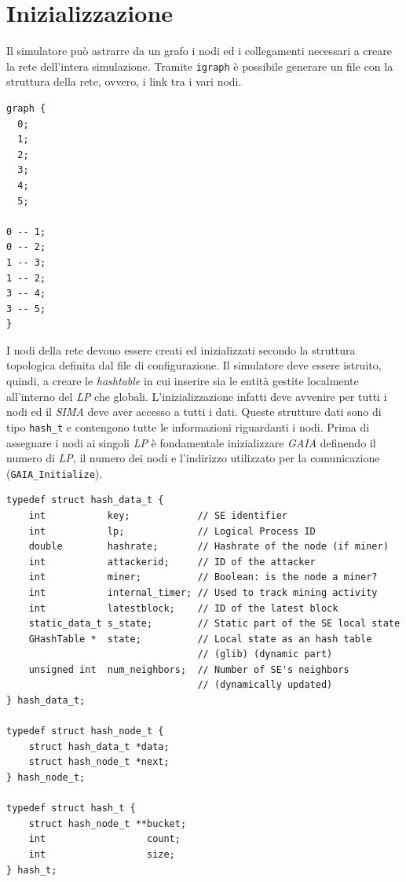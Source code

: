 \section{Inizializzazione}
Il simulatore può astrarre da un grafo i nodi ed i collegamenti necessari a creare la rete dell'intera simulazione. Tramite \texttt{igraph} è possibile generare un file con la struttura della rete, ovvero, i link tra i vari nodi.
\begin{lstlisting}[frame=none,caption=Esempio di un file generato da \texttt{igraph} con $6$ nodi.]
graph {
  0;
  1;
  2;
  3;
  4;
  5;

0 -- 1;
0 -- 2;
1 -- 3;
1 -- 2;
3 -- 4;
3 -- 5;
}
\end{lstlisting}
I nodi della rete devono essere creati ed inizializzati secondo la struttura topologica definita dal file di configurazione.
Il simulatore deve essere istruito, quindi, a creare le \textit{hashtable} in cui inserire sia le entità gestite localmente all'interno del \textit{LP} che globali. L'inizializzazione infatti deve avvenire per tutti i nodi ed il \textit{SIMA} deve aver accesso a tutti i dati. Queste strutture dati sono di tipo \texttt{hash\_t} e contengono tutte le informazioni riguardanti i nodi.\newline
Prima di assegnare i nodi ai singoli \textit{LP} è fondamentale inizializzare \textit{GAIA} definendo il numero di \textit{LP}, il numero dei nodi e l'indirizzo utilizzato per la comunicazione (\texttt{GAIA\_Initialize}).
\clearpage
\begin{code}
\begin{verbatim}
typedef struct hash_data_t {
    int           key;            // SE identifier
    int           lp;             // Logical Process ID
    double        hashrate;       // Hashrate of the node (if miner)
    int           attackerid;     // ID of the attacker
    int           miner;          // Boolean: is the node a miner?
    int           internal_timer; // Used to track mining activity
    int           latestblock;    // ID of the latest block
    static_data_t s_state;        // Static part of the SE local state
    GHashTable *  state;          // Local state as an hash table
                                  // (glib) (dynamic part)
    unsigned int  num_neighbors;  // Number of SE's neighbors
                                  // (dynamically updated)
} hash_data_t;

typedef struct hash_node_t {
    struct hash_data_t *data;
    struct hash_node_t *next;
} hash_node_t;

typedef struct hash_t {
    struct hash_node_t **bucket;
    int                  count;
    int                  size;
} hash_t;
\end{verbatim}
\end{code}
